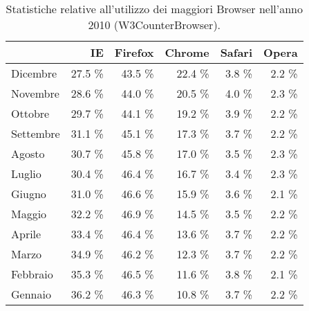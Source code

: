 \begin{table}
\begin{center}
\begin{tabular}{||p{4cm}|*{5}{r|}|}
	\hline
	\centering {\bfseries 2010}  & IE & Firefox & Chrome & Safari & Opera \\
	\hline
	\hline
	Dicembre & 27.5 \% & 43.5 \% & 22.4 \% & 3.8 \% & 2.2 \% \\
	\hline
	Novembre & 28.6 \% & 44.0 \% & 20.5 \% & 4.0 \% & 2.3 \% \\
	\hline
	Ottobre & 29.7 \% & 44.1 \% & 19.2 \% & 3.9 \% & 2.2 \% \\
	\hline
	Settembre & 31.1 \% & 45.1 \% & 17.3 \% & 3.7 \% & 2.2 \% \\
	\hline
	Agosto & 30.7 \% & 45.8 \% & 17.0 \% & 3.5 \% & 2.3 \% \\
	\hline
	Luglio & 30.4 \% & 46.4 \% & 16.7 \% & 3.4 \% & 2.3 \% \\
	\hline
	Giugno & 31.0 \% & 46.6 \% & 15.9 \% & 3.6 \% & 2.1 \% \\
	\hline
	Maggio & 32.2 \% & 46.9 \% & 14.5 \% & 3.5 \% & 2.2 \% \\
	\hline
	Aprile & 33.4 \% & 46.4 \% & 13.6 \% & 3.7 \% & 2.2 \% \\
	\hline
	Marzo & 34.9 \% & 46.2 \% & 12.3 \% & 3.7 \% & 2.2 \% \\
	\hline
	Febbraio & 35.3 \% & 46.5 \% & 11.6 \% & 3.8 \% & 2.1 \% \\
	\hline
	Gennaio & 36.2 \% & 46.3 \% & 10.8 \% & 3.7 \% & 2.2 \% \\
	\hline
\end{tabular}
 \caption{Statistiche relative all'utilizzo dei maggiori Browser nell'anno 2010 (W3CounterBrowser).}
 \label{tab:brow_stats_2010}
\end{center}
\end{table}

